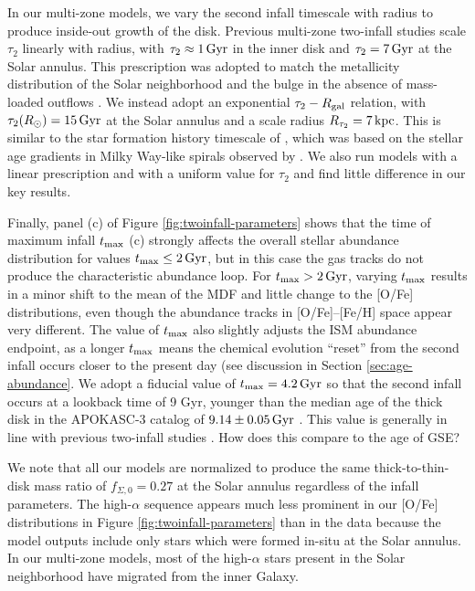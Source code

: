 \documentclass[twocolumn,twocolappendix,linenumbers]{aastex631}
\newcommand{\todo}[1]{{\color{red}#1}}
\begin{document}
In our multi-zone models, we vary the second infall timescale with radius to produce inside-out growth of the disk. Previous multi-zone two-infall studies \citep[e.g.,][]{chiappini_abundance_2001,palla_chemical_2020} scale $\tau_2$ linearly with radius, with $\tau_2\approx1\,{\rm Gyr}$ in the inner disk and $\tau_2=7\,{\rm Gyr}$ at the Solar annulus. This prescription was adopted to match the metallicity distribution of the Solar neighborhood and the bulge in the absence of mass-loaded outflows \citep{romano_mass_2000}. We instead adopt an exponential $\tau_2 - R_{\rm gal}$ relation, with $\tau_2(R_\odot)=15\,{\rm Gyr}$ at the Solar annulus and a scale radius $R_{\tau_2}=7\,{\rm kpc}$. This is similar to the star formation history timescale of \citet{johnson_stellar_2021}, which was based on the  stellar age gradients in Milky Way-like spirals observed by \citet{sanchez_spatially_2020}. We also run models with a linear prescription and with a uniform value for $\tau_2$ and find little difference in our key results.

Finally, panel (c) of Figure \ref{fig:twoinfall-parameters} shows that the time of maximum infall $t_{\rm max}$ (c) strongly affects the overall stellar abundance distribution for values $t_{\rm max}\leq2\,{\rm Gyr}$, but in this case the gas tracks do not produce the characteristic abundance loop. For $t_{\rm max}>2\,{\rm Gyr}$, varying $t_{\rm max}$ results in a minor shift to the mean of the MDF and little change to the [O/Fe] distributions, even though the abundance tracks in [O/Fe]--[Fe/H] space appear very different. The value of $t_{\rm max}$ also slightly adjusts the ISM abundance endpoint, as a longer $t_{\rm max}$ means the chemical evolution ``reset'' from the second infall occurs closer to the present day (see discussion in Section \ref{sec:age-abundance}. We adopt a fiducial value of $t_{\rm max}=4.2\,{\rm Gyr}$ so that the second infall occurs at a lookback time of 9 Gyr, younger than the median age of the thick disk in the APOKASC-3 catalog of $9.14\pm0.05\,{\rm Gyr}$ \citep{pinsonneault_apokasc-3_2025}. This value is generally in line with previous two-infall studies \citep[e.g.,][]{nissen_high-precision_2020,spitoni_galactic_2020,spitoni_apogee_2021}. \todo{How does this compare to the age of GSE?}

We note that all our models are normalized to produce the same thick-to-thin-disk mass ratio of $f_{\Sigma,0}=0.27$ \citep{bland-hawthorn_galaxy_2016} at the Solar annulus regardless of the infall parameters. The high-$\alpha$ sequence appears much less prominent in our [O/Fe] distributions in Figure \ref{fig:twoinfall-parameters} than in the data because the model outputs include only stars which were formed in-situ at the Solar annulus. In our multi-zone models, most of the high-$\alpha$ stars present in the Solar neighborhood have migrated from the inner Galaxy.
\end{document}
